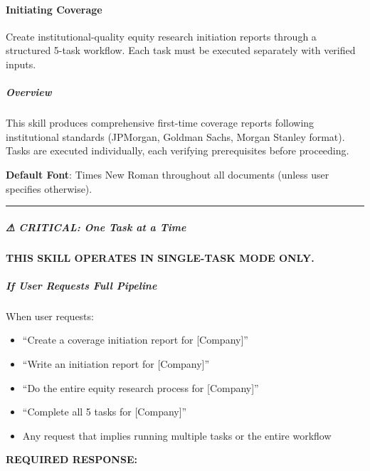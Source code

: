 \documentclass[11pt]{article}
\begin{document}
\paragraph{Initiating Coverage}\mbox{}\par

Create institutional-quality equity research initiation reports through a structured 5-task workflow. Each task must be executed separately with verified inputs.


\subparagraph{Overview}\mbox{}\par

This skill produces comprehensive first-time coverage reports following institutional standards (JPMorgan, Goldman Sachs, Morgan Stanley format). Tasks are executed individually, each verifying prerequisites before proceeding.


\textbf{Default Font}: Times New Roman throughout all documents (unless user specifies otherwise).


\vspace{0.5em}\hrule\vspace{0.5em}

\subparagraph{⚠ CRITICAL: One Task at a Time}\mbox{}\par

\textbf{THIS SKILL OPERATES IN SINGLE-TASK MODE ONLY.}


\subparagraph{If User Requests Full Pipeline}\mbox{}\par

When user requests:

\begin{itemize}[leftmargin=*,itemsep=2pt,topsep=2pt]
\item {} ``Create a coverage initiation report for [Company]''
\item {} ``Write an initiation report for [Company]''
\item {} ``Do the entire equity research process for [Company]''
\item {} ``Complete all 5 tasks for [Company]''
\item {} Any request that implies running multiple tasks or the entire workflow
\end{itemize}

\textbf{REQUIRED RESPONSE:}
\end{document}
